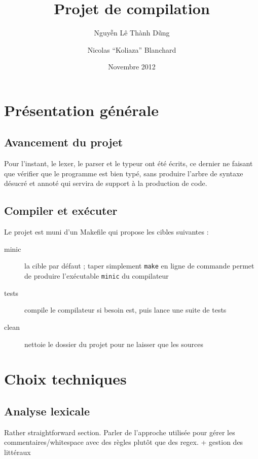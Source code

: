 \documentclass[a4paper, 11pt]{article}
\begin{document}
 
\title{Projet de compilation}
\author{Nguy\~{\^e}n Lê Thành D\~ung \and Nicolas ``Koliaza'' Blanchard}
\date{Novembre 2012}
\maketitle

\section{Présentation générale}

\subsection{Avancement du projet}

Pour l'instant, le lexer, le parser et le typeur ont été écrits, ce dernier
ne faisant que vérifier que le programme est bien typé, sans produire l'arbre
de syntaxe désucré et annoté qui servira de support à la production de code.

\subsection{Compiler et exécuter}

Le projet est muni d'un Makefile qui propose les cibles suivantes :
\begin{description}
\item[minic] la cible par défaut ; taper simplement \texttt{make} en ligne
  de commande permet de produire l'exécutable \texttt{minic} du compilateur
\item[tests] compile le compilateur si besoin est, puis lance une suite de tests
\item[clean] nettoie le dossier du projet pour ne laisser que les sources
\end{description}




\section{Choix techniques}

\subsection{Analyse lexicale}

Rather straightforward section.
Parler de l'approche utilisée pour gérer les commentaires/whitespace avec
des règles plutôt que des regex.
+ gestion des littéraux
\end{document}
